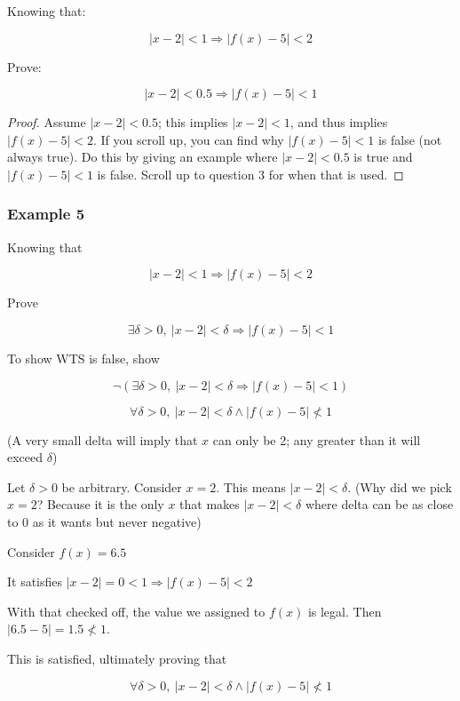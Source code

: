 \documentclass[12pt]{article}
\theoremstyle{plain}
\theoremstyle{remark}
\theoremstyle{definition}
\begin{document}
Knowing that:

\[|x - 2| < 1 \Rightarrow \left| f(x) - 5 \right| < 2\]

Prove:

\[|x - 2| < 0.5 \Rightarrow \left| f(x) - 5 \right| < 1\]

\begin{proof}

Assume \(|x - 2| < 0.5\); this implies \(|x - 2| < 1\), and thus implies
\(\left| f(x) - 5 \right| < 2\). If you scroll up, you can find why
\(\left| f(x) - 5 \right| < 1\) is false (not always true). Do this by
giving an example where \(|x - 2| < 0.5\) is true and
\(\left| f(x) - 5 \right| < 1\) is false. Scroll up to question 3 for
when that is used.



\end{proof}
\subsubsection{Example 5}

Knowing that

\[|x - 2| < 1 \Rightarrow \left| f(x) - 5 \right| < 2\]

Prove

\[\exists\delta > 0,\ |x - 2| < \delta \Rightarrow \left| f(x) - 5 \right| < 1\]

To show WTS is false, show

\[\neg\left( \exists\delta > 0,\ |x - 2| < \delta \Rightarrow \left| f(x) - 5 \right| < 1 \right)\]

\[\forall\delta > 0,\ |x - 2| < \delta \land |f(x) - 5| \nless 1\]

(A very small delta will imply that \(x\) can only be 2; any greater
than it will exceed \(\delta\))

Let \(\delta > 0\) be arbitrary. Consider \(x = 2\). This means
\(|x - 2| < \delta\). (Why did we pick \(x = 2\)? Because it is the only
\(x\) that makes \(|x - 2| < \delta\) where delta can be as close to 0
as it wants but never negative)

Consider \(f(x) = 6.5\)

It satisfies \(|x - 2| = 0 < 1 \Rightarrow \left| f(x) - 5 \right| < 2\)

With that checked off, the value we assigned to \(f(x)\) is legal. Then
\(|6.5 - 5| = 1.5 \nless 1\).

This is satisfied, ultimately proving that

\[\forall\delta > 0,\ |x - 2| < \delta \land |f(x) - 5| \nless 1\]
\end{document}
